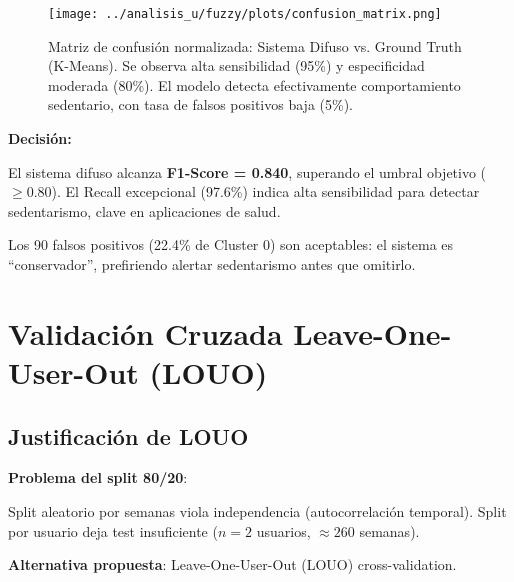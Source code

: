 \documentclass[12pt,letterpaper,twoside]{report}
\begin{document}
\begin{figure}[htbp]
\centering
\texttt{[image: ../analisis\_u/fuzzy/plots/confusion\_matrix.png]}
\caption{Matriz de confusión normalizada: Sistema Difuso vs. Ground Truth (K-Means). Se observa alta sensibilidad (95\%) y especificidad moderada (80\%). El modelo detecta efectivamente comportamiento sedentario, con tasa de falsos positivos baja (5\%).}
\label{fig:confusion_matrix_fuzzy}
\end{figure}

\begin{decisionbox}
\textbf{Decisión:}

El sistema difuso alcanza \textbf{F1-Score = 0.840}, superando el umbral objetivo ($\geq 0.80$). El Recall excepcional (97.6\%) indica alta sensibilidad para detectar sedentarismo, clave en aplicaciones de salud.

Los 90 falsos positivos (22.4\% de Cluster 0) son aceptables: el sistema es ``conservador'', prefiriendo alertar sedentarismo antes que omitirlo.
\end{decisionbox}

\section{Validación Cruzada Leave-One-User-Out (LOUO)}

\subsection{Justificación de LOUO}

\begin{hipotesisbox}
\textbf{Problema del split 80/20}:

Split aleatorio por semanas viola independencia (autocorrelación temporal). Split por usuario deja test insuficiente ($n=2$ usuarios, $\approx 260$ semanas).

\textbf{Alternativa propuesta}: Leave-One-User-Out (LOUO) cross-validation.
\end{hipotesisbox}
\end{document}
